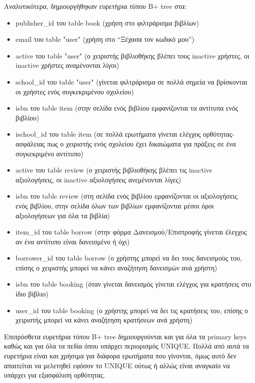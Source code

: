\documentclass[a4paper]{article}
\begin{document}
\par Αναλυτικότερα, δημιουργήθηκαν ευρετήρια τύπου B+ tree στα:
\begin{itemize}
    \item publisher\_id του table book (χρήση στο φιλτράρισμα βιβλίων)
    \item email του table "user" (χρήση στο ``Ξέχασα τον κωδικό μου'')
    \item active του table "user" (ο χειριστής βιβλιοθήκης βλέπει τους inactive χρήστες, οι inactive χρήστες αναμένονται λίγοι)
    \item school\_id του table "user" (γίνεται φιλτράρισμα σε πολλά σημεία να βρίσκονται οι χρήστες ενός συγκεκριμένου σχολείου)
    \item isbn του table item (στην σελίδα ενός βιβλίου εμφανίζονται τα αντίτυπα ενός βιβλίου)
    \item ischool\_id του table item (σε πολλά ερωτήματα γίνεται ελέγχος ορθότητας-ασφάλειας πως ο χειριστής ενός σχολείου έχει δικαιώματα για πράξεις σε ένα συγκεκριμένο αντίτυπο)
    \item active του table review (ο χειριστής βιβλιοθήκης βλέπει τις inactive αξιολογήσεις, οι inactive αξιολογήσεις ανεμένονται λίγες)
    \item isbn του table review (στη σελίδα ενός βιβλίου εμφανίζονται οι αξιολογήσεις ενός βιβλίου, στην σελίδα όλων των βιβλίων εμφανίζονται μέσοι όροι αξιολογήσεων για όλα τα βιβλία)
    \item item\_id του table borrow (στην φόρμα Δανεισμού/Επιστροφής γίνεται έλεγχος αν ένα αντίτυπο είναι δανεισμένο ή όχι)
    \item borrower\_id του table borrow (ο χρήστης μπορεί να δει τους δανεισμούς του, επίσης ο χειριστής μπορεί να κάνει αναζήτηση δανεισμών ανά χρήστη)
    \item isbn του table booking (όταν γίνεται δανεισμός γίνεται ελέγχος για κρατήσεις στο ίδιο βίβλιο)
    \item user\_id του table booking (ο χρήστης μπορεί να δει τις κρατήσεις του, επίσης ο χειριστής μπορεί να κάνει αναζήτηση κρατήσεων ανά χρήστη)
\end{itemize}
\par Επιπρόσθετα ευρετήρια τύπου B+ tree δημιουργούνται και για όλα τα primary keys καθώς και για όλα τα πεδία όπου υπάρχει περιορισμός UNIQUE. Πολλά από αυτά τα ευρετήρια είναι και χρήσιμα για διάφορα ερωτήματα που γίνονται, όμως αυτό δεν απαιτείται να μελετηθεί εφόσον το UNIQUE ούτως ή αλλώς είναι αναγκαίο να υπάρχει για εξασφάλιση ορθότητας.
\end{document}
